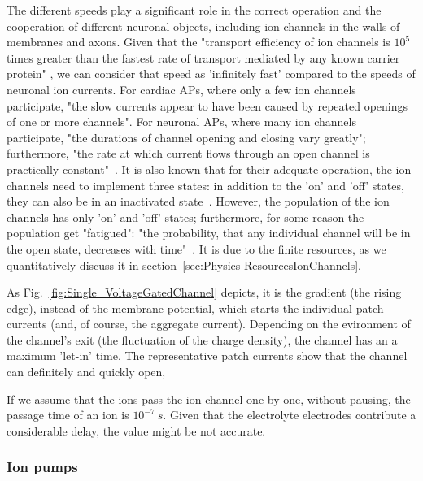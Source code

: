
The different speeds play a significant role in the correct operation and
the cooperation of different neuronal objects, including ion channels
in the walls of membranes and axons. 
Given that the "transport efficiency of ion channels
is  $10^5$ times greater than the fastest rate of transport mediated by any known carrier protein"
\cite{MolecularBiology:2002}, we can consider that speed as 'infinitely fast' compared to the speeds of neuronal ion currents.
For cardiac \gls{AP}s,
where only a few ion channels participate,
"the slow currents appear to
have been caused by repeated openings of one or more channels"\cite{CardiacAPS:1980}.
For neuronal \gls{AP}s,
where many ion channels participate,
"the durations of channel opening and closing vary greatly";
furthermore,
"the rate at which current flows through an open channel is practically constant"~\cite{MolecularBiology:2002}.
It is also known that  for their adequate operation, the ion channels need to implement
three states: in addition to the 'on' and 'off' states, they can also be in an inactivated
state~\cite{ThreeStateUnidirectional:2004, MarkovianIonChannel:2005}.
However, the population of the ion channels has only 'on' and 'off' states;
furthermore, for some reason the population get "fatigued":
"the probability, that any individual channel
will be in the open state, decreases with time"~\cite{MolecularBiology:2002}. 
It is due to the finite resources, as we quantitatively discuss it in section~\ref{sec:Physics-ResourcesIonChannels}.

As Fig.~\ref{fig:Single_VoltageGatedChannel} depicts, it is the gradient (the rising edge), 
instead of the membrane potential, which 
starts the individual patch currents (and, of course, 
the aggregate current).
Depending on the evironment of the channel's exit (the fluctuation
of the charge density), the channel has an a maximum 'let-in' time.
The representative patch currents show that the channel can definitely 
and quickly open, 

If we assume that the ions
pass the ion channel one by one, without pausing, the passage time of an ion 
is $10^{-7}\ s$. Given that the electrolyte electrodes contribute 
a considerable delay, the value might be not accurate.

\subsubsection{Ion pumps\label{sec:Single-IonPumps}}

